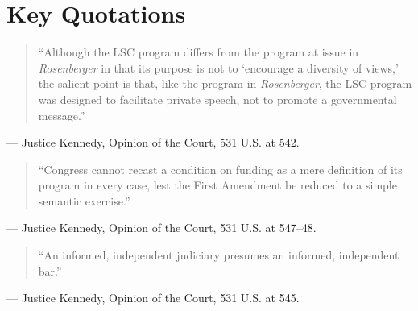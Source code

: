 \documentclass[12pt]{article}
\begin{document}
\section{Key Quotations}

\begin{quote}
``Although the LSC program differs from the program at issue in \textit{Rosenberger} in that its purpose is not to `encourage a diversity of views,' the salient point is that, like the program in \textit{Rosenberger}, the LSC program was designed to facilitate private speech, not to promote a governmental message.''
\end{quote}
\noindent --- Justice Kennedy, Opinion of the Court, 531 U.S. at 542.

\begin{quote}
``Congress cannot recast a condition on funding as a mere definition of its program in every case, lest the First Amendment be reduced to a simple semantic exercise.''
\end{quote}
\noindent --- Justice Kennedy, Opinion of the Court, 531 U.S. at 547--48.

\begin{quote}
``An informed, independent judiciary presumes an informed, independent bar.''
\end{quote}
\noindent --- Justice Kennedy, Opinion of the Court, 531 U.S. at 545.
\end{document}
